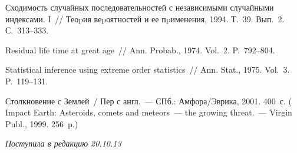 \begin{multicols}{2}
{{\begin{thebibliography}{99}
 Сходимость случайных последовательностей с независимыми
случайными индексами. I~// Теоpия веpоятностей и ее пpименения,
1994. Т.~39. Вып.~2. С.~313--333.



 Residual life time at great age~// Ann. Probab., 1974. 
Vol.~2. P.~792--804.

 Statistical inference using extreme order
statistics~// Ann. Stat., 1975. Vol.~3. P.~119--131.

 Столкновение с Землей~/
Пер с англ.~--- СПб.: Ам\-фо\-ра/Эв\-ри\-ка, 2001. 400~с.
( Impact Earth: Asteroids, comets and meteors~--- the growing threat.~---
Virgin Publ., 1999. 256~p.)
\end{thebibliography} } }



\end{multicols}

\hfill{\small\textit{Поступила в редакцию 20.10.13}}








\newpage



\def\tit{A LIMIT THEOREM FOR GEOMETRIC SUMS OF~INDEPENDENT NONIDENTICALLY DISTRIBUTED RANDOM VARIABLES AND~ITS~APPLICATION 
TO~THE~PREDICTION OF~THE~PROBABILITIES 
OF~CATASTROPHES IN~NONHOMOGENEOUS FLOWS OF~EXTREMAL EVENTS}

\def\aut{M.\,E.~Grigor'eva$^1$, V.\,Yu.~Korolev$^{2,3}$, and~I.\,A.~Sokolov$^3$}
\def\autkol{M.\,E.~Grigor'eva, V.\,Yu.~Korolev, and~I.\,A.~Sokolov}
\def\titkol{A limit theorem for geometric sums of~independent nonidentically 
distributed random variables and~its~application} %


